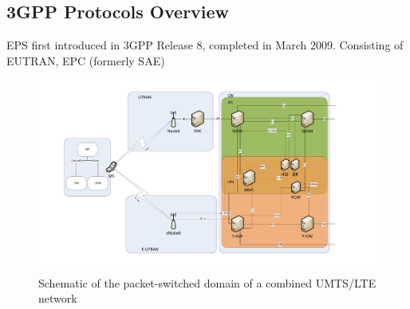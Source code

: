








\subsection{3GPP Protocols Overview}



EPS first introduced in 3GPP Release 8, completed in March 2009. Consisting of EUTRAN, EPC (formerly SAE)


	


\begin{figure}[htbp]
	\centering
 	\includegraphics[width=1.3\textwidth]{images/eps_ps-overview.pdf}
 	\caption{Schematic of the packet-switched domain of a combined UMTS/LTE network}
 	\label{c4:fig:psdomain}
\end{figure}

